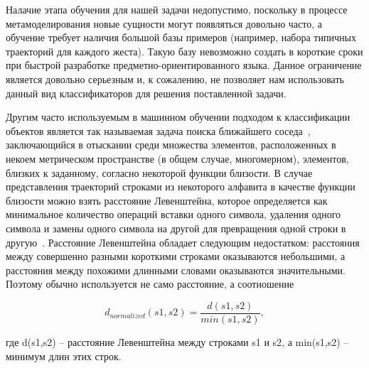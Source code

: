 \documentclass[a5paper]{article}
\begin{document}
Налачие этапа обучения для нашей задачи недопустимо, поскольку в процессе метамоделирования новые сущности могут появляться
довольно часто, а обучение требует наличия большой базы примеров (например, набора типичных траекторий для каждого жеста). Такую
базу невозможно создать в короткие сроки при быстрой разработке предметно-ориентированного языка. 
Данное ограничение является довольно серьезным и, к сожалению, не позволяет нам использовать данный вид классификаторов для решения 
поставленной задачи.

Другим часто используемым в машинном обучении подходом к классификации объектов является так называемая задача поиска ближайшего 
соседа~\cite{nns1, nns2}, заключающийся в отыскании среди множества элементов, расположенных в некоем метрическом пространстве (в 
общем случае, многомерном), элементов, близких к заданному, согласно некоторой функции близости. 
В случае представления траекторий строками из некоторого алфавита в качестве функции близости можно взять расстояние Левенштейна, 
которое определяется как минимальное количество операций вставки одного символа, удаления одного символа и замены 
одного символа на другой для превращения одной строки в другую~\cite{levenshtein}. Расстояние Левенштейна обладает следующим недостатком:
расстояния между совершенно разными короткими строками оказываются небольшими, а расстояния между похожими длинными словами 
оказываются значительными. Поэтому обычно используется не само расстояние, а соотношение 

\begin{equation}
\label{levenshtein}
d_{normalized}(s1,s2) = \frac{d(s1,s2)}{min(s1,s2)},
\end{equation}

где d(s1,s2) -- расстояние Левенштейна между строками s1 и s2, а min(s1,s2) -- минимум длин этих строк.
\end{document}
